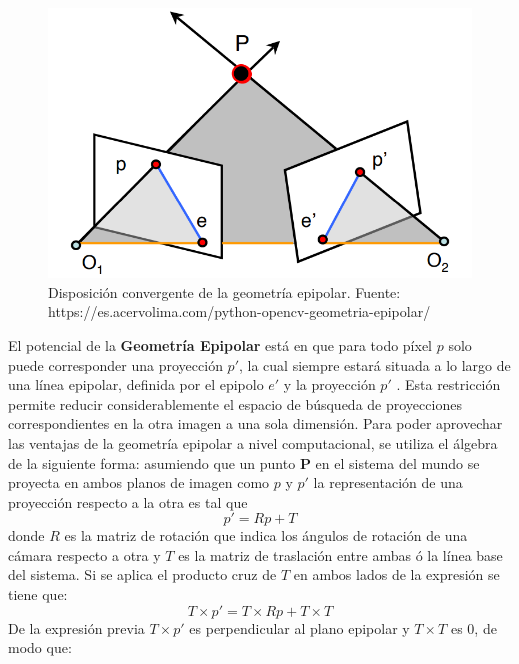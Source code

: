\begin{figure}[H]
    \centering
    \includegraphics[scale=0.3]{Recursos/epipolar_geometry.png}
    \caption[Disposición convergente de la geometría epipolar.]{Disposición convergente de la geometría epipolar. {\footnotesize Fuente: https://es.acervolima.com/python-opencv-geometria-epipolar/ \cite{acervolima}}}
    \label{epipolar_geometry}
\end{figure}
El potencial de la \textbf{Geometría Epipolar} está en que para todo píxel $p$ solo puede corresponder una proyección $p'$, la cual siempre estará situada a lo largo de una línea epipolar, definida por el epipolo $e'$ y la proyección $p'$ \cite[p~754]{Szeliski2022}. Esta restricción permite reducir considerablemente el espacio de búsqueda de proyecciones correspondientes en la otra imagen a una sola dimensión. Para poder aprovechar las ventajas de la geometría epipolar a nivel computacional, se utiliza el álgebra de la siguiente forma: asumiendo que un punto \textbf{P} en el sistema del mundo se proyecta en ambos planos de imagen como $p$ y $p'$ la representación de una proyección respecto a la otra es tal que
\begin{equation}
    p' = Rp + T
\end{equation} 
donde $R$ es la matriz de rotación que indica los ángulos de rotación de una cámara respecto a otra y $T$ es la matriz de traslación entre ambas ó la línea base del sistema. Si se aplica el producto cruz de $T$ en ambos lados de la expresión se tiene que:
\begin{equation}
    T \times p' = T \times Rp + T \times T
\end{equation}
De la expresión previa $T \times p'$ es perpendicular al plano epipolar y $T \times T$ es 0, de modo que:
